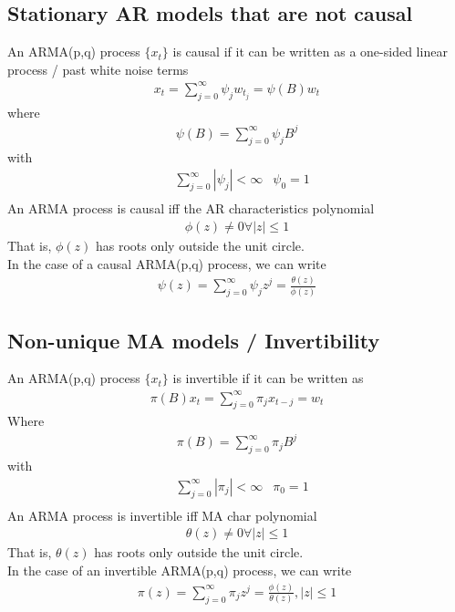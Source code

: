 \subsection{Stationary AR models that are not causal }
An ARMA(p,q) process $\{ x_t \}$ is causal if it can be written as a one-sided linear process / past white noise terms
    \begin{align*}
        x_t = \sum_{j=0}^\infty \psi_j w_{t_j} = \psi(B) w_t
    \end{align*}
where 
    \begin{align*}
        \psi(B) = \sum_{j=0}^\infty \psi_jB^j
    \end{align*}
with 
    \begin{align*}
        & \sum_{j=0}^\infty |\psi_j| < \infty & \psi_0 = 1\\
    \end{align*}
An ARMA process is causal iff the AR characteristics polynomial 
    \begin{align*}
        \phi(z) \neq 0 \forall |z| \leq 1 
    \end{align*}
That is, $\phi(z)$ has roots only outside the unit circle. \\
In the case of a causal ARMA(p,q) process, we can write  
    \begin{align*}
        \psi(z) = \sum_{j=0}^\infty \psi_j z^j = \frac{\theta(z)}{\phi(z)}
    \end{align*}

\subsection{Non-unique MA models / Invertibility }
An ARMA(p,q) process $\{ x_t \}$ is invertible if it can be written as 
    \begin{align*}
        \pi(B) x_t = \sum_{j=0}^\infty \pi_j x_{t-j} = w_t
    \end{align*}
Where
    \begin{align*}
        \pi(B) = \sum_{j=0}^\infty \pi_j B^j
    \end{align*}
with 
    \begin{align*}
        & \sum_{j=0}^\infty |\pi_j| < \infty & \pi_0 = 1\\
    \end{align*}
An ARMA process is invertible iff MA char polynomial 
    \begin{align*}
        \theta(z) \neq 0 \forall |z| \leq 1
    \end{align*}
That is, $\theta(z)$ has roots only outside the unit circle. \\
In the case of an invertible ARMA(p,q) process, we can write 
    \begin{align*}
        \pi(z) = \sum_{j=0}^\infty \pi_j z^j = \frac{\phi(z)}{\theta(z)}, |z| \leq 1
    \end{align*}
    
